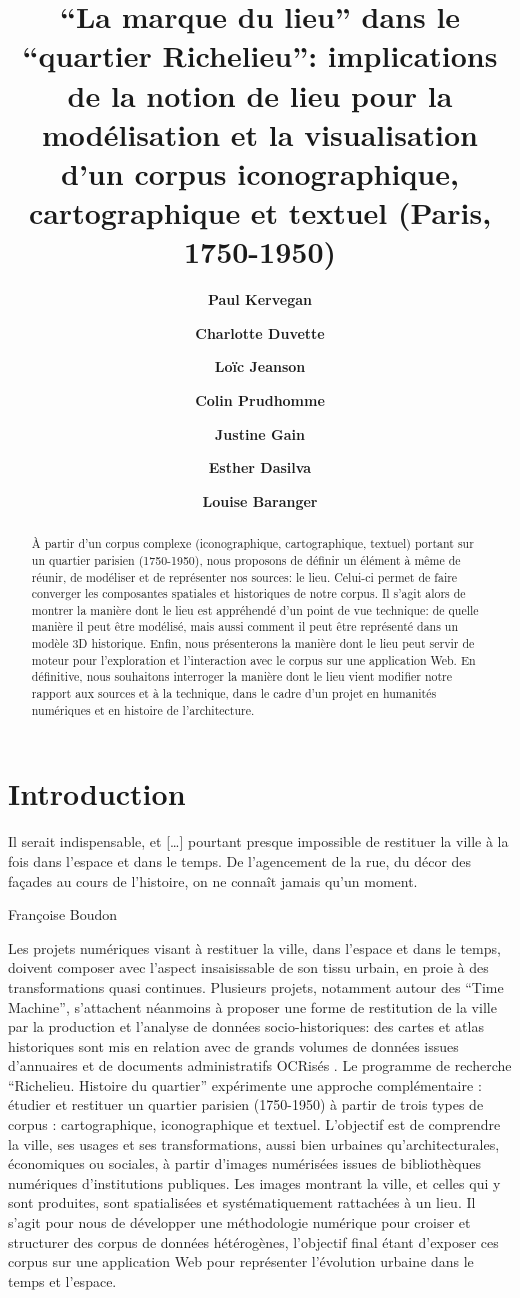 \documentclass[11pt,french]{article}
\title{\enquote{La marque du lieu} dans le \enquote{quartier Richelieu}: implications de la notion de lieu pour la modélisation et la visualisation d’un corpus iconographique, cartographique et textuel (Paris, 1750-1950)}
\author[1]{\textbf{Paul Kervegan}}
\author[1]{\textbf{Charlotte Duvette}}
\author[2]{\textbf{Loïc Jeanson}}
\author[1]{\textbf{Colin Prudhomme}}
\author[1]{\authorcr \textbf{Justine Gain}}
\author[1]{\textbf{Esther Dasilva}}
\author[1]{\textbf{Louise Baranger}}
\affil[1]{Institut national d'histoire de l'art \authorcr
\texttt{\{prenom.nom\}@inha.fr}}
\affil[2]{Université de Lausanne \authorcr
\texttt{\{prenom.nom\}@unil.ch}}
\begin{document}
\maketitle

\begin{abstract}
À partir d'un corpus complexe (iconographique, cartographique, textuel) portant sur un quartier parisien (1750-1950), nous proposons de définir un élément à même de réunir, de modéliser et de représenter nos sources: le lieu. Celui-ci permet de faire converger les composantes spatiales et historiques de notre corpus. Il s'agit alors de montrer la manière dont le lieu est appréhendé d'un point de vue technique: de quelle manière il peut être modélisé, mais aussi comment il peut être représenté dans un modèle 3D historique. Enfin, nous présenterons la manière dont le lieu peut servir de moteur pour l'exploration et l'interaction avec le corpus sur une application Web. En définitive, nous souhaitons interroger la manière dont le lieu vient modifier notre rapport aux sources et à la technique, dans le cadre d'un projet en humanités numériques et en histoire de l'architecture.
\end{abstract}

\section*{Introduction}
\epigraph{
	Il serait indispensable, et […] pourtant presque impossible de restituer la ville à la fois dans l'espace et dans le temps. De l'agencement de la rue, du décor des façades au cours de l'histoire, on ne connaît jamais qu'un moment.
}{Françoise Boudon \citep{boudon_systeme_1977}}

Les projets numériques visant à restituer la ville, dans l'espace et dans le temps, doivent composer avec l'aspect insaisissable de son tissu urbain, en proie à des transformations quasi continues. Plusieurs projets, notamment autour des \enquote{Time Machine}, s'attachent néanmoins à proposer une forme de restitution de la ville par la production et l'analyse de données socio-historiques: des cartes et atlas historiques sont mis en relation avec de grands volumes de données issues d'annuaires et de documents administratifs OCRisés
\citep{khemakhem_fueling_2018,berenbaum_mining_2018,bell_automated_2020,di_leonardo_approche_2021,uchida_benchmark_2022}. Le programme de recherche \enquote{Richelieu. Histoire du quartier} expérimente une approche complémentaire : étudier et restituer un quartier parisien (1750-1950) à partir de trois types de corpus : cartographique, iconographique et textuel. L'objectif est de comprendre la ville, ses usages et ses transformations, aussi bien urbaines qu'architecturales, économiques ou sociales, à partir d'images numérisées issues de bibliothèques numériques d'institutions publiques. Les images montrant la ville, et celles qui y sont produites, sont spatialisées et systématiquement rattachées à un lieu. Il s'agit pour nous de développer une méthodologie numérique pour croiser et structurer des corpus de données hétérogènes, l'objectif final étant d'exposer ces corpus sur une application Web pour représenter l'évolution urbaine dans le temps et l'espace.
\end{document}
